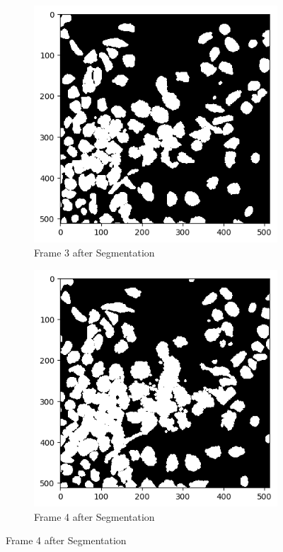 \documentclass{article}
\begin{document}
\begin{figure}[h!]
  \begin{subfigure}{0.4\textwidth}
    \includegraphics[width=\linewidth]{Report/Appendix_Images/Segmentation-A-Control/frame_3.png}
    \caption*{Frame 3 after Segmentation}
  \end{subfigure}
  \hfill
  \begin{subfigure}{0.4\textwidth}
    \includegraphics[width=\linewidth]{Report/Appendix_Images/Segmentation-A-Control/frame_4.png}
    \caption*{Frame 4 after Segmentation}
  \end{subfigure}


\end{figure}
\end{document}
